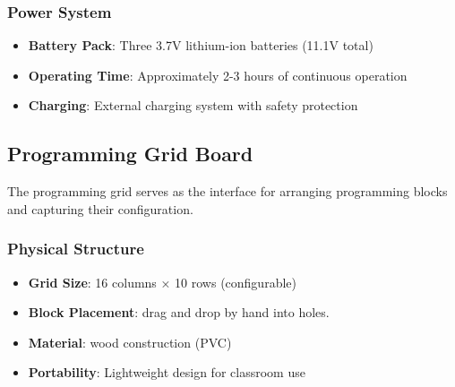 \subsubsection{Power System}
\begin{itemize}
    \item \textbf{Battery Pack}: Three 3.7V lithium-ion batteries (11.1V total)
    \item \textbf{Operating Time}: Approximately 2-3 hours of continuous operation
    \item \textbf{Charging}: External charging system with safety protection
\end{itemize}

\subsection{Programming Grid Board}

The programming grid serves as the interface for arranging programming blocks and capturing their configuration.

\subsubsection{Physical Structure}
\begin{itemize}
    \item \textbf{Grid Size}: 16 columns × 10 rows (configurable)
    \item \textbf{Block Placement}:  drag and drop by hand into holes.
    \item \textbf{Material}: wood construction (PVC)
    \item \textbf{Portability}: Lightweight design for classroom use
\end{itemize}

